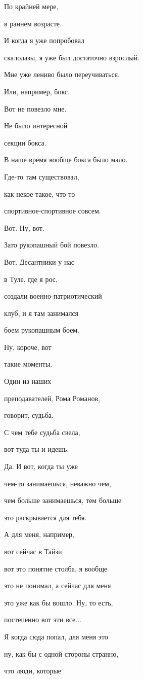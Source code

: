 По крайней мере,

в раннем возрасте.

И когда я уже попробовал

скалолазы, я уже был достаточно взрослый.

Мне уже лениво было переучиваться.

Или, например, бокс.

Вот не повезло мне.

Не было интересной

секции бокса.

В наше время вообще бокса было мало.

Где-то там существовал,

как некое такое, что-то

спортивное-спортивное совсем.

Вот. Ну, вот.

Зато рукопашный бой повезло.

Вот. Десантники у нас

в Туле, где я рос,

создали военно-патриотический

клуб, и я там занимался

боем рукопашным боем.

Ну, короче, вот

такие моменты.

Один из наших

преподавателей, Рома Романов,

говорит, судьба.

С чем тебе судьба свела,

вот туда ты и идешь.

Да. И вот, когда ты уже

чем-то занимаешься, неважно чем,

чем больше занимаешься, тем больше

это раскрывается для тебя.

А для меня, например,

вот сейчас в Тайзи

вот это понятие столба, я вообще

это не понимал, а сейчас для меня

это уже как бы вошло. Ну, то есть,

постепенно вот эти все...

Я когда сюда попал, для меня это

ну, как бы с одной стороны странно,

что люди, которые

